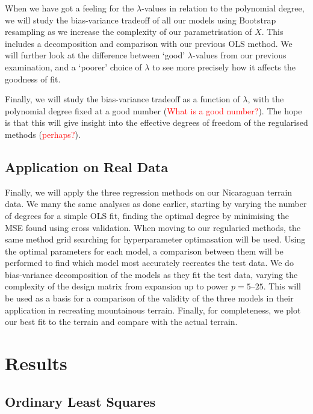 \documentclass[twocolumn,english,notitlepage]{article}
\newcommand{\comment}[1]{\textcolor{red}{#1}}
\begin{document}
        When we have got a feeling for the $\lambda$-values in relation to the polynomial degree, we will study the bias-variance tradeoff of all our models using Bootstrap resampling as we increase the complexity of our parametrisation of $X$. This includes a decomposition and comparison with our previous OLS method. We will further look at the difference between `good' $\lambda$-values from our previous examination, and a `poorer' choice of $\lambda$ to see more precisely how it affects the goodness of fit.

        Finally, we will study the bias-variance tradeoff as a function of $\lambda$, with the polynomial degree fixed at a good number (\comment{What is a good number?}). The hope is that this will give insight into the effective degrees of freedom of the regularised methods (\comment{perhaps?}).

    \subsection{Application on Real Data}
        Finally, we will apply the three regression methods on our Nicaraguan terrain data. We many the same analyses as done earlier, starting by varying the number of degrees for a simple OLS fit, finding the optimal degree by minimising the MSE found using cross validation.
        When moving to our regularied methods, the same method grid searching for hyperparameter optimasation will be used. Using the optimal parameters for each model, a comparison between them will be performed to find which model most accurately recreates the test data. We do bias-variance decomposition of the models as they fit the test data, varying the complexity of the design matrix from expansion up to power $p=5\text{--}25$. This will be used as a basis for a comparison of the validity of the three models in their application in recreating mountainous terrain. Finally, for completeness, we plot our best fit to the terrain and compare with the actual terrain.


\section{Results}
    \subsection{Ordinary Least Squares}
\end{document}
